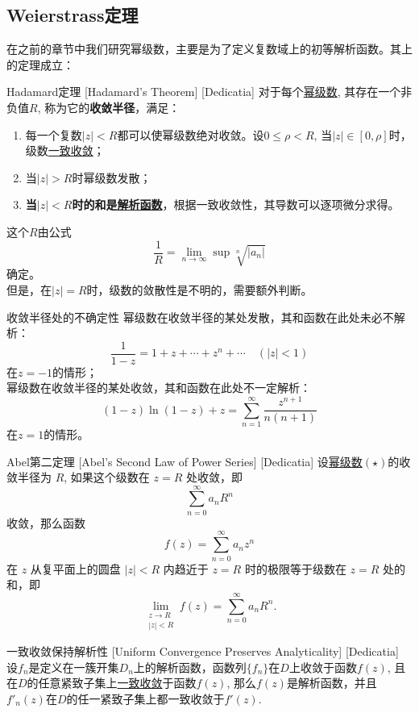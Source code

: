 \documentclass[UTF8]{ctexart}
\newcommand{\AnalyticalFunction}{\hyperref[dfn:AnalyticalFunction]{解析函数}}
\newcommand{\PowerSeries}{\hyperref[dfn:PowerSeries]{幂级数}}
\newcommand{\UniformConvergence}{\hyperref[dfn:UniformConvergence]{一致收敛}}
\begin{document}
\subsection{Weierstrass定理}
在之前的章节中我们研究幂级数，主要是为了定义复数域上的初等解析函数。其上的定理成立：
\begin{thm}
    [UUID]
    {Hadamard定理}
    [Hadamard's Theorem]
    [Dedicatia]
    对于每个\PowerSeries , 其存在一个非负值$R$, 称为它的\textbf{收敛半径}，满足：
    \begin{enumerate}
        \item 每一个复数$|z|<R$都可以使幂级数绝对收敛。设$0\leqslant\rho <R$, 当$|z|\in[0,\rho]$时，级数\UniformConvergence ；
        \item 当$|z|>R$时幂级数发散；
        \item \textbf{当$|z|<R$时的和是\AnalyticalFunction }，根据一致收敛性，其导数可以逐项微分求得。
    \end{enumerate}
    这个$R$由公式
    \[\frac{1}{R}=\lim_{n\to \infty}\sup\sqrt[n]{|a_n|}\]
    确定。\\
    但是，在$|z|=R$时，级数的敛散性是不明的，需要额外判断。
\end{thm}
\begin{cxmp}
    {收敛半径处的不确定性}
    幂级数在收敛半径的某处发散，其和函数在此处未必不解析：
    \[\frac{1}{1-z}=1+z+\cdots+z^n+\cdots\quad(|z|<1) \]
    在$z=-1$的情形；\\
    幂级数在收敛半径的某处收敛，其和函数在此处不一定解析：
    \[(1-z)\ln(1-z)+z=\sum_{n=1}^{\infty}\frac{z^{n+1}}{n(n+1)}\]
    在$z=1$的情形。
\end{cxmp}
\begin{thm}
    [UUID]
    {Abel第二定理}
    [Abel's Second Law of Power Series]
    [Dedicatia]
    设\PowerSeries $(\star)$的收敛半径为 \( R \), 如果这个级数在 \( z = R \) 处收敛，即
    \[\sum_{n=0}^{\infty} a_n R^n\]
    收敛，那么函数
    \[f(z) = \sum_{n=0}^{\infty} a_n z^n\]
    在 \( z \) 从复平面上的圆盘 \( |z| < R \) 内趋近于 \( z = R \) 时的极限等于级数在 \( z = R \) 处的和，即
    \[\lim_{\substack{z \to R \\ |z| < R}} f(z) = \sum_{n=0}^{\infty} a_n R^n.\]
\end{thm}
\begin{thm}
    [UUID]
    {一致收敛保持解析性}
    [Uniform Convergence Preserves Analyticality]
    [Dedicatia]
    设$f_n$是定义在一簇开集$D_n$上的解析函数，函数列$\{f_n\}$在$D$上收敛于函数$f(z)$, 且在$D$的任意紧致子集上\UniformConvergence 于函数$f(z)$, 那么$f(z)$是解析函数，并且$f'_n(z)$在$D$的任一紧致子集上都一致收敛于$f'(z)$.
\end{thm}
\end{document}
